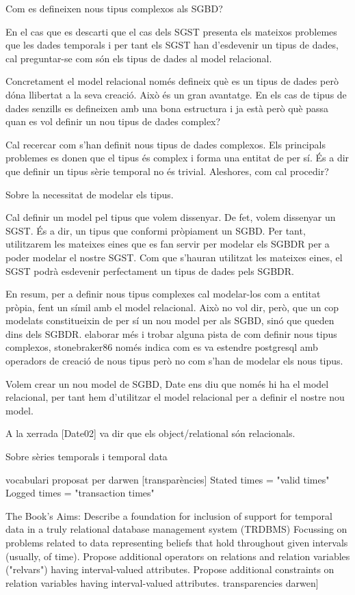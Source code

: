 Com es defineixen nous tipus complexos als SGBD?

En el cas que es descarti que el cas dels SGST presenta els mateixos problemes que les dades temporals i per tant els SGST han d'esdevenir un tipus de dades, cal preguntar-se com són els tipus de dades al model relacional.

Concretament el model relacional només defineix què es un tipus de dades però dóna llibertat a la seva creació. Això és un gran avantatge. En els cas de tipus de dades senzills es defineixen amb una bona estructura i ja està però què passa quan es vol definir un nou tipus de dades complex?

Cal recercar com s'han definit nous tipus de dades complexos. Els principals problemes es donen que el tipus és complex i forma una entitat de per sí. És a dir que definir un tipus sèrie temporal no és trivial. Aleshores, com cal procedir?



Sobre la necessitat de modelar els tipus.

Cal definir un model pel tipus que volem dissenyar.
De fet, volem dissenyar un SGST. És a dir, un tipus que conformi pròpiament un SGBD. Per tant, utilitzarem les mateixes eines que es fan servir per modelar els SGBDR per a poder modelar el nostre SGST. Com que s'hauran utilitzat les mateixes eines, el SGST podrà esdevenir perfectament un tipus de dades pels SGBDR.

En resum, per a definir nous tipus complexes cal modelar-los com a entitat pròpia, fent un símil amb el model relacional. Això no vol dir, però, que un cop modelats constitueixin de per sí un nou model per als SGBD, sinó que queden dins dels SGBDR.  elaborar més i trobar alguna pista de com definir nous tipus complexos, stonebraker86 només indica com es va estendre postgresql amb operadors de creació de nous tipus però no com s'han de modelar els nous tipus.

Volem crear un nou model de SGBD, Date ens diu que només hi ha el model relacional, per tant hem d'utilitzar el model relacional per a definir el nostre nou model.


A la xerrada [Date02] va dir que els object/relational són relacionals.


Sobre sèries temporals i temporal data\cite{assfalg08:thesis}

vocabulari proposat per darwen [transparències]
Stated times = "valid times"
Logged times = "transaction times"


The Book’s Aims:
Describe a foundation for inclusion of support for temporal data in a truly
relational database management system (TRDBMS)
Focussing on problems related to data representing beliefs that hold throughout
given intervals (usually, of time).
Propose additional operators on relations and relation variables ("relvars")
having interval-valued attributes.
Propose additional constraints on relation variables having interval-valued
attributes.
transparencies darwen]


